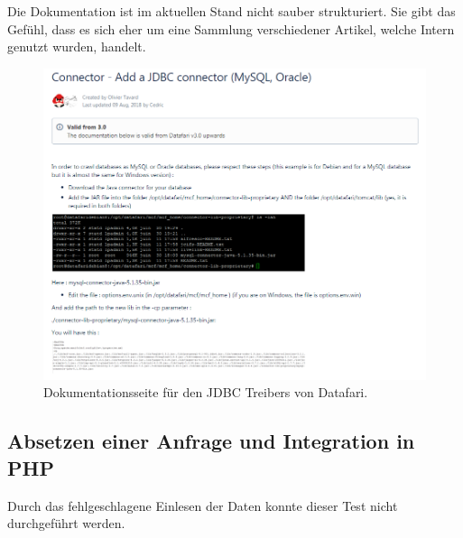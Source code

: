 Die Dokumentation ist im aktuellen Stand nicht sauber strukturiert. Sie gibt das Gefühl, dass es sich eher um eine Sammlung verschiedener Artikel, welche Intern genutzt wurden, handelt.

\begin{figure}
	\centering
	\includegraphics[width=1\linewidth]{images/datafari_doku_wrong_path.png}
	\caption{Dokumentationsseite für den JDBC Treibers von Datafari.}
	\label{img:datafariJDBC}
\end{figure}


\subsection{Absetzen einer Anfrage und Integration in PHP}

Durch das fehlgeschlagene Einlesen der Daten konnte dieser Test nicht durchgeführt werden.
